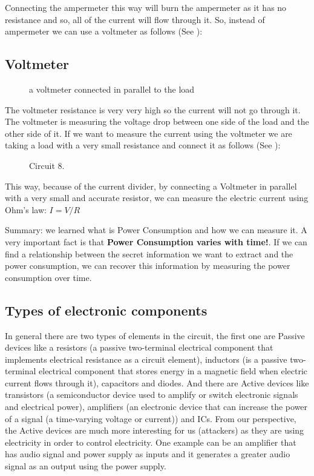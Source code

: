 Connecting the ampermeter this way will burn the ampermeter as it has no resistance and so, all of the current will flow through it. So, instead of ampermeter we can use a voltmeter as follows (See ):

\subsection{Voltmeter}

\begin{figure}[!ht]
    \centering
    
    \caption{a voltmeter connected in parallel to the load} \label{fig:circuit7}
\end{figure}

The voltmeter resistance is very very high so the current will not go through it. The voltmeter is measuring the voltage drop between one side of the load and the other side of it. If we want to measure the current using the voltmeter we are taking a load with a very small resistance and connect it as follows (See ):

\begin{figure}[!ht]
    \centering
    
    \caption{Circuit 8.} \label{fig:circuit8}
\end{figure}

This way, because of the current divider, by connecting a Voltmeter in parallel with a very small and accurate resistor, we can measure the electric current using Ohm's law: $I=V/R$
 
Summary: we learned what is Power Consumption and how we can measure it.
A very important fact is that \textbf{Power Consumption varies with time!}.
If we can find a relationship between the secret information we want to extract and the power consumption, we can recover this information by measuring the power consumption over time.

\subsection{Types of electronic components}

In general there are two types of elements in the circuit, the first one are Passive devices like a resistors (a passive two-terminal electrical component that implements electrical resistance as a circuit element), inductors (is a passive two-terminal electrical component that stores energy in a magnetic field when electric current flows through it), capacitors and diodes. And there are Active devices like transistors (a semiconductor device used to amplify or switch electronic signals and electrical power), amplifiers (an electronic device that can increase the power of a signal (a time-varying voltage or current)) and ICs. From our perspective, the Active devices are much more interesting for us (attackers) as they are using electricity in order to control electricity. One example can be an amplifier that has audio signal and power supply as inputs and it generates a greater audio signal as an output using the power supply. 

